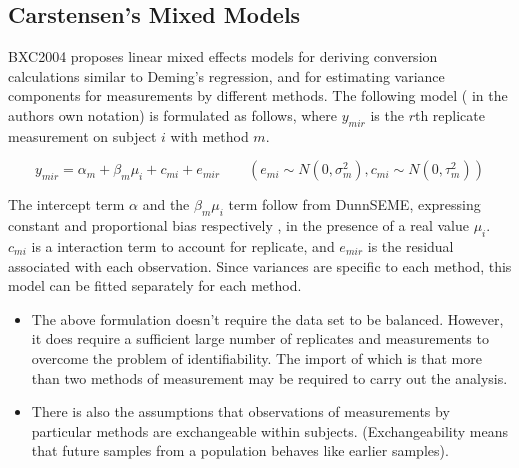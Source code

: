 \documentclass[compress]{beamer}        %
\begin{document}
\subsection{Carstensen's Mixed Models}
\begin{frame}
\alert{BXC2004} proposes linear mixed effects models for deriving
conversion calculations similar to Deming's regression, and for
estimating variance components for measurements by different
methods. The following model ( in the authors own notation) is
formulated as follows, where $y_{mir}$ is the $r$th replicate
measurement on subject $i$ with method $m$.

\begin{equation}
y_{mir}  = \alpha_{m} + \beta_{m}\mu_{i} + c_{mi} + e_{mir} \qquad
( e_{mi} \sim N(0,\sigma^{2}_{m}), c_{mi} \sim N(0,\tau^{2}_{m}))
\end{equation}
\end{frame}
\begin{frame}
The intercept term $\alpha$ and the $\beta_{m}\mu_{i}$ term follow
from \alert{DunnSEME}, expressing constant and proportional bias
respectively , in the presence of a real value $\mu_{i}.$
 $c_{mi}$ is a interaction term to account for replicate, and
 $e_{mir}$ is the residual associated with each observation.
Since variances are specific to each method, this model can be
fitted separately for each method.
\end{frame}
\begin{frame}
\begin{itemize}
\item The above formulation doesn't require the data set to be balanced.
However, it does require a sufficient large number of replicates
and measurements to overcome the problem of identifiability. The
import of which is that more than two methods of measurement may
be required to carry out the analysis. 
\item There is also the
assumptions that observations of measurements by particular
methods are exchangeable within subjects. (Exchangeability means
that future samples from a population behaves like earlier
samples).
\end{itemize}


\end{frame}
\end{document}
